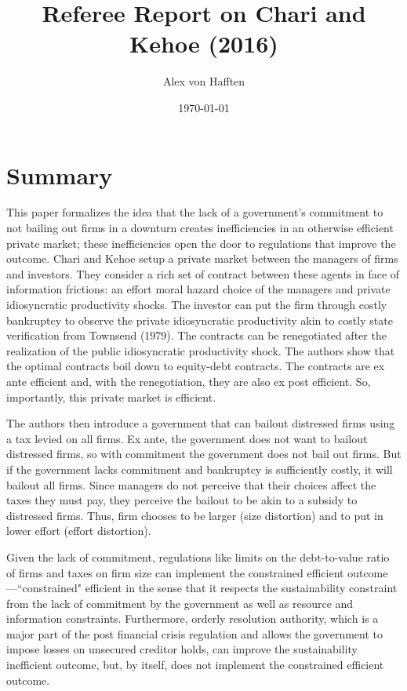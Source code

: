 \documentclass{article}
\title{Referee Report on Chari and Kehoe (2016)}
\author{Alex von Hafften}
\date{\today}
\begin{document}
\maketitle

\section{Summary}

This paper formalizes the idea that the lack of a government's commitment to not bailing out firms in a downturn creates inefficiencies in an otherwise efficient private market; these inefficiencies open the door to regulations that improve the outcome.  Chari and Kehoe setup a private market between the managers of firms and investors.  They consider a rich set of contract between these agents in face of information frictions: an effort moral hazard choice of the managers and private idiosyncratic productivity shocks.  The investor can put the firm through costly bankruptcy to observe the private idiosyncratic productivity akin to costly state verification from Townsend (1979). The contracts can be renegotiated after the realization of the public idiosyncratic productivity shock. The authors show that the optimal contracts boil down to equity-debt contracts.  The contracts are ex ante efficient and, with the renegotiation, they are also ex post efficient.  So, importantly, this private market is efficient.

\bigskip

The authors then introduce a government that can bailout distressed firms using a tax levied on all firms.  Ex ante, the government does not want to bailout distressed firms, so with commitment the government does not bail out firms. But if the government lacks commitment and bankruptcy is sufficiently costly, it will bailout all firms. Since managers do not perceive that their choices affect the taxes they must pay, they perceive the bailout to be akin to a subsidy to distressed firms. Thus, firm chooses to be larger (size distortion) and to put in lower effort (effort distortion).

\bigskip

Given the lack of commitment, regulations like limits on the debt-to-value ratio of firms and taxes on firm size can implement the constrained efficient outcome---``constrained" efficient in the sense that it respects the sustainability constraint from the lack of commitment by the government as well as resource and information constraints. Furthermore, orderly resolution authority, which is a major part of the post financial crisis regulation and allows the government to impose losses on unsecured creditor holds, can improve the sustainability inefficient outcome, but, by itself, does not implement the constrained efficient outcome.
\end{document}
